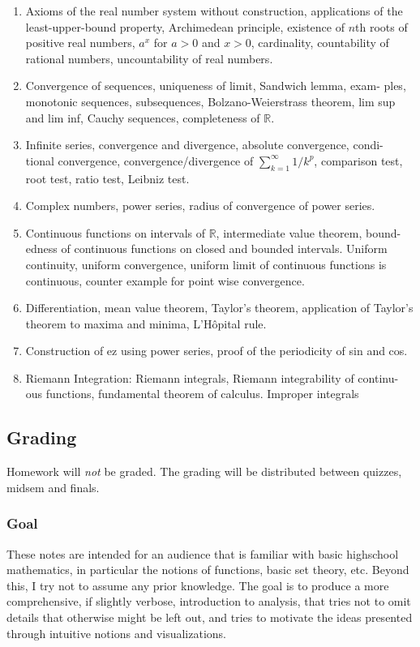 \begin{enumerate}
\item Axioms of the real number system without construction, applications of
the least-upper-bound property, Archimedean principle, existence of $n$th roots of
positive real numbers, $a^x$ for $a > 0$ and $x > 0$, cardinality, countability of rational
numbers, uncountability of real numbers.
\item Convergence of sequences, uniqueness of limit, Sandwich lemma, exam-
ples, monotonic sequences, subsequences, Bolzano-Weierstrass theorem, lim sup and
lim inf, Cauchy sequences, completeness of $\mathbb{R}$.
\item Infinite series, convergence and divergence, absolute convergence, condi-
tional convergence, convergence/divergence of $\sum_{k=1}^{\infty} 1/k^p$, comparison test, root test,
ratio test, Leibniz test.
\item Complex numbers, power series, radius of convergence of power series.
\item Continuous functions on intervals of $\mathbb{R}$, intermediate value theorem, bound-
edness of continuous functions on closed and bounded intervals. Uniform continuity,
uniform convergence, uniform limit of continuous functions is continuous, counter
example for point wise convergence.
\item Differentiation, mean value theorem, Taylor's theorem, application of Taylor's theorem to maxima and minima,
L'Hôpital rule.
\item Construction of ez using power series, proof of the periodicity of sin and
cos.
\item Riemann Integration: Riemann integrals, Riemann integrability of continu-
ous functions, fundamental theorem of calculus. Improper integrals
\end{enumerate}

\subsection{Grading}

Homework will \emph{not} be graded. The grading will be distributed between quizzes, midsem and finals.

\subsubsection{Goal}

These notes are intended for an audience that is familiar with basic highschool mathematics,
in particular the notions of functions, basic set theory, etc. Beyond this, I try not
to assume any prior knowledge. The goal is to produce a more comprehensive, if slightly verbose,
introduction to analysis, that tries not to omit details that otherwise might be left out, and
tries to motivate the ideas presented through intuitive notions and visualizations.

